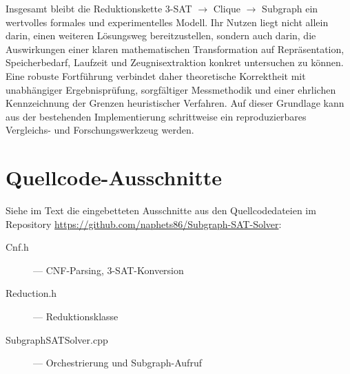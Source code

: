 \documentclass[a4paper,12pt]{article}
\theoremstyle{definition}
\begin{document}
Insgesamt bleibt die Reduktionskette 3-SAT $\to$ Clique $\to$ Subgraph ein wertvolles formales und experimentelles Modell. Ihr Nutzen liegt nicht allein darin, einen weiteren Lösungsweg bereitzustellen, sondern auch darin, die Auswirkungen einer klaren mathematischen Transformation auf Repräsentation, Speicherbedarf, Laufzeit und Zeugnisextraktion konkret untersuchen zu können. Eine robuste Fortführung verbindet daher theoretische Korrektheit mit unabhängiger Ergebnisprüfung, sorgfältiger Messmethodik und einer ehrlichen Kennzeichnung der Grenzen heuristischer Verfahren. Auf dieser Grundlage kann aus der bestehenden Implementierung schrittweise ein reproduzierbares Vergleichs- und Forschungswerkzeug werden.

\appendix
\section{Quellcode-Ausschnitte}
\label{app:code}
Siehe im Text die eingebetteten Ausschnitte aus den Quellcodedateien im Repository \url{https://github.com/naphets86/Subgraph-SAT-Solver}:
\begin{description}
  \item[Cnf.h] — CNF-Parsing, 3-SAT-Konversion
  \item[Reduction.h] — Reduktionsklasse
  \item[SubgraphSATSolver.cpp] — Orchestrierung und Subgraph-Aufruf
\end{description}
\end{document}
